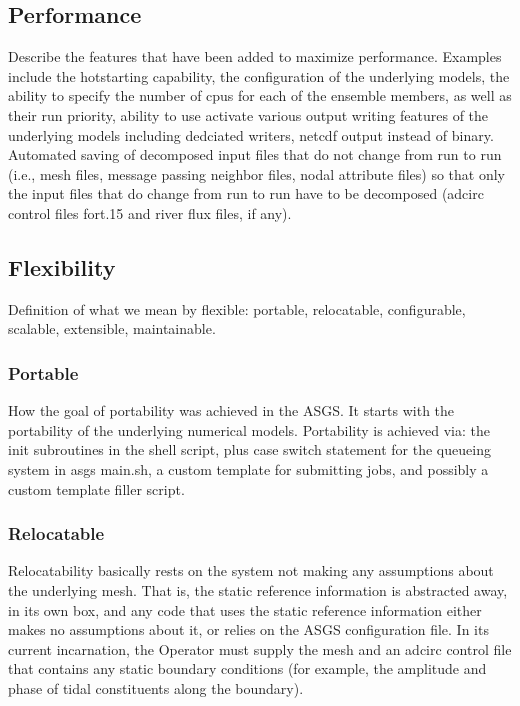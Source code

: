 \documentclass[12pt]{article}
\begin{document}
\subsection{Performance}

Describe the features that have been added to maximize performance. 
Examples include the hotstarting capability, the configuration of 
the underlying models, the ability to specify the number of cpus for 
each of the ensemble members, as well as their run priority, ability 
to use activate various output writing features of the underlying 
models including dedciated writers, netcdf output instead of binary. 
Automated saving of decomposed input files that do not change from 
run to run (i.e., mesh files, message passing neighbor files, nodal 
attribute files) so that only the input files that do change from 
run to run have to be decomposed (adcirc control files fort.15 and 
river flux files, if any). 

\subsection{Flexibility}

Definition of what we mean by flexible: portable, relocatable, 
configurable, scalable, extensible, maintainable.

\subsubsection{Portable}

How the goal of portability was achieved in the ASGS. It starts with 
the portability of the underlying numerical models. Portability is achieved
via: the init subroutines in the shell script, plus case switch statement for
the queueing system in asgs main.sh, a custom template for submitting 
jobs, and possibly a custom template filler script. 

\subsubsection{Relocatable}

Relocatability basically rests on the system not making any 
assumptions about the underlying mesh. That is, the static reference 
information is abstracted away, in its own box, and any code that 
uses the static reference information either makes no assumptions 
about it, or relies on the ASGS configuration file. In its current 
incarnation, the Operator must supply the mesh and an adcirc control 
file that contains any static boundary conditions (for example, the 
amplitude and phase of tidal constituents along the boundary). 
\end{document}
